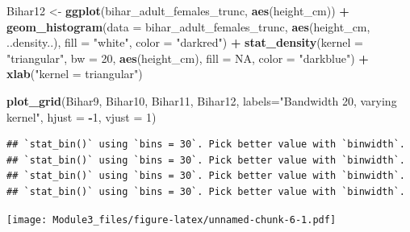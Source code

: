 \documentclass[]{book}
\newenvironment{Shaded}{\begin{snugshade}}{\end{snugshade}}
\newcommand{\KeywordTok}[1]{\textcolor[rgb]{0.13,0.29,0.53}{\textbf{#1}}}
\newcommand{\DataTypeTok}[1]{\textcolor[rgb]{0.13,0.29,0.53}{#1}}
\newcommand{\DecValTok}[1]{\textcolor[rgb]{0.00,0.00,0.81}{#1}}
\newcommand{\StringTok}[1]{\textcolor[rgb]{0.31,0.60,0.02}{#1}}
\newcommand{\OtherTok}[1]{\textcolor[rgb]{0.56,0.35,0.01}{#1}}
\newcommand{\OperatorTok}[1]{\textcolor[rgb]{0.81,0.36,0.00}{\textbf{#1}}}
\newcommand{\NormalTok}[1]{#1}
\theoremstyle{definition}
\theoremstyle{definition}
\theoremstyle{definition}
\theoremstyle{remark}
\begin{document}
\begin{Shaded}
\begin{Highlighting}[]
\NormalTok{Bihar12 <-}\StringTok{ }\KeywordTok{ggplot}\NormalTok{(bihar_adult_females_trunc, }\KeywordTok{aes}\NormalTok{(height_cm)) }\OperatorTok{+}\StringTok{ }
\StringTok{  }\KeywordTok{geom_histogram}\NormalTok{(}\DataTypeTok{data =}\NormalTok{ bihar_adult_females_trunc, }\KeywordTok{aes}\NormalTok{(height_cm, ..density..), }\DataTypeTok{fill =} \StringTok{"white"}\NormalTok{, }\DataTypeTok{color =} \StringTok{"darkred"}\NormalTok{) }\OperatorTok{+}
\StringTok{  }\KeywordTok{stat_density}\NormalTok{(}\DataTypeTok{kernel =} \StringTok{"triangular"}\NormalTok{, }\DataTypeTok{bw =} \DecValTok{20}\NormalTok{, }\KeywordTok{aes}\NormalTok{(height_cm), }\DataTypeTok{fill =} \OtherTok{NA}\NormalTok{, }\DataTypeTok{color =} \StringTok{"darkblue"}\NormalTok{) }\OperatorTok{+}
\StringTok{  }\KeywordTok{xlab}\NormalTok{(}\StringTok{"kernel = triangular"}\NormalTok{)}

\KeywordTok{plot_grid}\NormalTok{(Bihar9, Bihar10, Bihar11, Bihar12, }\DataTypeTok{labels=}\StringTok{"Bandwidth 20, varying kernel"}\NormalTok{, }\DataTypeTok{hjust =} \OperatorTok{-}\DecValTok{1}\NormalTok{, }\DataTypeTok{vjust =} \DecValTok{1}\NormalTok{)}
\end{Highlighting}
\end{Shaded}

\begin{verbatim}
## `stat_bin()` using `bins = 30`. Pick better value with `binwidth`.
## `stat_bin()` using `bins = 30`. Pick better value with `binwidth`.
## `stat_bin()` using `bins = 30`. Pick better value with `binwidth`.
## `stat_bin()` using `bins = 30`. Pick better value with `binwidth`.
\end{verbatim}

\texttt{[image: Module3\_files/figure-latex/unnamed-chunk-6-1.pdf]}


\end{document}

